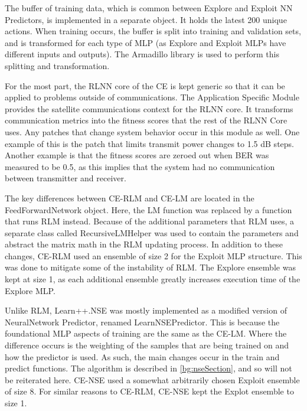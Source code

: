 \par The buffer of training data, which is common between Explore and Exploit NN Predictors, is implemented in a separate object. It holds the latest 200 unique actions. When training occurs, the buffer is split into training and validation sets, and is transformed for each type of MLP (as Explore and Exploit MLPs have different inputs and outputs). The Armadillo library is used to perform this splitting and transformation.
\par For the most part, the RLNN core of the CE is kept generic so that it can be applied to problems outside of communications. The Application Specific Module provides the satellite communications context for the RLNN core. It transforms communication metrics into the fitness scores that the rest of the RLNN Core uses. Any patches that change system behavior occur in this module as well. One example of this is the patch that limits transmit power changes to 1.5 dB steps. Another example is that the fitness scores are zeroed out when BER was measured to be 0.5, as this implies that the system had no communication between transmitter and receiver. 
\par The key differences between CE-RLM and CE-LM are located in the FeedForwardNetwork object. Here, the LM function was replaced by a function that runs RLM instead. Because of the additional parameters that RLM uses, a separate class called RecursiveLMHelper was used to contain the parameters and abstract the matrix math in the RLM updating process. In addition to these changes, CE-RLM used an ensemble of size 2 for the Exploit MLP structure. This was done to mitigate some of the instability of RLM. The Explore ensemble was kept at size 1, as each additional ensemble greatly increases execution time of the Explore MLP.
\par Unlike RLM, Learn++.NSE was mostly implemented as a modified version of NeuralNetwork Predictor, renamed LearnNSEPredictor. This is because the foundational MLP aspects of training are the same as the CE-LM. Where the difference occurs is the weighting of the samples that are being trained on and how the predictor is used. As such, the main changes occur in the train and predict functions. The algorithm is described in \ref{bg:nseSection}, and so will not be reiterated here. CE-NSE used a somewhat arbitrarily chosen Exploit ensemble of size 8. For similar reasons to CE-RLM, CE-NSE kept the Explot ensemble to size 1.
